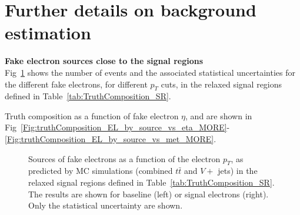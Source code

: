 \clearpage 
\section{Further details on background estimation}
\label{App:FakeLep}
	
	
\par{\bf Fake electron sources close to the signal regions \\}
Fig~\ref{Fig:truthComposition_EL_by_source_vs_pt_MORE} shows the number of events and the associated statistical uncertainties for the different fake electrons, for different $p_T$ cuts, in the relaxed signal regions defined in Table~\ref{tab:TruthComposition_SR}. 

Truth composition as a function of fake electron $\eta$, \meff and \met are shown in Fig~\ref{Fig:truthComposition_EL_by_source_vs_eta_MORE}-\ref{Fig:truthComposition_EL_by_source_vs_met_MORE}.

\begin{figure}[p]  
\centering
{}
\caption   
{Sources of fake electrons as a function of the electron $p_T$, as predicted by MC simulations (combined $t\bar t$ and $V+$ jets) 
in the relaxed signal regions defined in Table~\ref{tab:TruthComposition_SR}. The results are shown for baseline (left) or signal electrons (right). Only the statistical uncertainty are shown.}
\label{Fig:truthComposition_EL_by_source_vs_pt_MORE}
\end{figure}  
	
